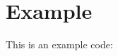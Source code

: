 \documentclass[oneside,english]{book}
\begin{document}
\section*{Example}

This is an example code:


\end{document}

